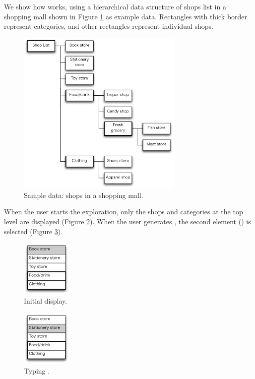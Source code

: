 \documentclass{article}
\begin{document}
We show how {\ST} works, using a hierarchical data structure of
shops list in a shopping mall shown in Figure \ref{fig1} as example data.
Rectangles with thick border represent categories, and
other rectangles represent individual shops.

\begin{figure}[H]
\centerline{\includegraphics[width=80mm,bb=0 0 490 490]{figures/fig1.pdf}}
\caption{Sample data: shops in a shopping mall.}
\label{fig1}
\end{figure}

When the user starts the exploration, only the shops and categories
at the top level are displayed (Figure \ref{fig2}).
When the user generates {\D},
the second element () is selected (Figure \ref{fig3}).

\begin{figure}[H]
\centerline{\includegraphics[width=24mm,bb=0 0 139 157]{figures/fig2.pdf}}
\caption{Initial display.}
\label{fig2}
\end{figure}

\begin{figure}[H]
\centerline{\includegraphics[width=24mm,bb=0 0 139 157]{figures/fig3.pdf}}
\caption{Typing {\D}.}
\label{fig3}
\end{figure}
\end{document}
